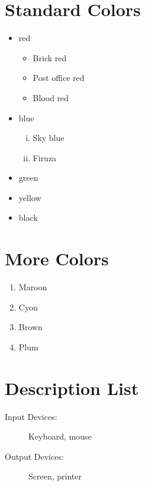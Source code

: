 \documentclass{article}
\begin{document}
    \renewcommand{\labelitemi}{$\diamond$}
    \renewcommand{\labelitemii}{$\circ$}
    \section{Standard Colors}
    \begin{itemize}
        \item red
        \begin{itemize}
            \item Brick red
            \item Post office red
            \item Blood red
        \end{itemize}
        \item blue
        \begin{enumerate}[i.]
            \item Sky blue
            \item Firuza
        \end{enumerate}
        \item green
        \item yellow
        \item black
    \end{itemize}

    \section{More Colors}
    \begin{enumerate}
        \item Maroon
        \item Cyon
        \item Brown
        \item Plum
    \end{enumerate}

    \section{Description List}
    \begin{description}
        \item[Input Devices:] Keyboard, mouse
        \item[Output Devices:] Screen, printer
    \end{description}
\end{document}
